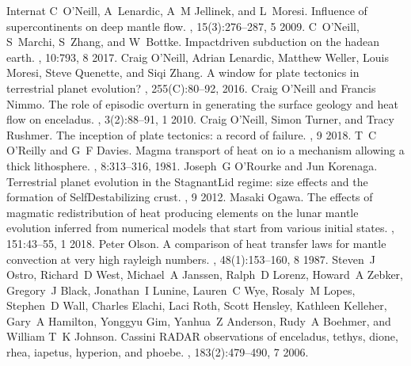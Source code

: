 \documentclass[letterpaper,10pt,english]{jupyterBook}
\begin{document}
\begin{sphinxthebibliography}{Internat}
\sphinxAtStartPar
C O'Neill, A Lenardic, A M Jellinek, and L Moresi. Influence of supercontinents on deep mantle flow. , 15(3):276–287, 5 2009.
\sphinxAtStartPar
C O'Neill, S Marchi, S Zhang, and W Bottke. Impact\sphinxhyphen{}driven subduction on the hadean earth. , 10:793, 8 2017.
\sphinxAtStartPar
Craig O'Neill, Adrian Lenardic, Matthew Weller, Louis Moresi, Steve Quenette, and Siqi Zhang. A window for plate tectonics in terrestrial planet evolution? , 255(C):80–92, 2016.
\sphinxAtStartPar
Craig O'Neill and Francis Nimmo. The role of episodic overturn in generating the surface geology and heat flow on enceladus. , 3(2):88–91, 1 2010.
\sphinxAtStartPar
Craig O'Neill, Simon Turner, and Tracy Rushmer. The inception of plate tectonics: a record of failure. , 9 2018.
\sphinxAtStartPar
T C O'Reilly and G F Davies. Magma transport of heat on io \sphinxhyphen{} a mechanism allowing a thick lithosphere. , 8:313–316, 1981.
\sphinxAtStartPar
Joseph G O'Rourke and Jun Korenaga. Terrestrial planet evolution in the Stagnant\sphinxhyphen{}Lid regime: size effects and the formation of Self\sphinxhyphen{}Destabilizing crust. , 9 2012.
\sphinxAtStartPar
Masaki Ogawa. The effects of magmatic redistribution of heat producing elements on the lunar mantle evolution inferred from numerical models that start from various initial states. , 151:43–55, 1 2018.
\sphinxAtStartPar
Peter Olson. A comparison of heat transfer laws for mantle convection at very high rayleigh numbers. , 48(1):153–160, 8 1987.
\sphinxAtStartPar
Steven J Ostro, Richard D West, Michael A Janssen, Ralph D Lorenz, Howard A Zebker, Gregory J Black, Jonathan I Lunine, Lauren C Wye, Rosaly M Lopes, Stephen D Wall, Charles Elachi, Laci Roth, Scott Hensley, Kathleen Kelleher, Gary A Hamilton, Yonggyu Gim, Yanhua Z Anderson, Rudy A Boehmer, and William T K Johnson. Cassini RADAR observations of enceladus, tethys, dione, rhea, iapetus, hyperion, and phoebe. , 183(2):479–490, 7 2006.

\end{sphinxthebibliography}
\end{document}
